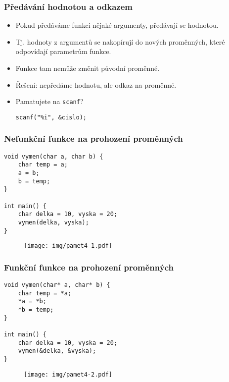 \documentclass{beamer}
\newenvironment{itemizey}%
  {\large \begin{itemize}%
    \setlength{\itemsep}{6pt}%
    \setlength{\parskip}{6pt}}%
  {\end{itemize}}
\begin{document}
\begin{frame}[t,fragile]\frametitle{Předávání hodnotou a odkazem} 
    \begin{itemizey}
        \item Pokud předáváme funkci nějaké argumenty, předávají se hodnotou.
        \item Tj. hodnoty z argumentů se nakopírují do nových proměnných, které odpovídají parametrům funkce.
        \item Funkce tam nemůže změnit původní proměnné. 
        \item Řešení: nepředáme hodnotu, ale odkaz na proměnné. 
        \item Pamatujete na \texttt{scanf}? 
        \begin{verbatim} 
scanf("%i", &cislo);
        \end{verbatim}
    \end{itemizey}
\end{frame}


\begin{frame}[t,fragile]\frametitle{Nefunkční funkce na prohození proměnných} 
    \begin{verbatim} 
void vymen(char a, char b) {
    char temp = a;
    a = b;
    b = temp;
}

int main() {
    char delka = 10, vyska = 20;
    vymen(delka, vyska);
}
    \end{verbatim}

\begin{figure}[htb]
    \centering
    \texttt{[image: img/pamet4-1.pdf]}
\end{figure}
\end{frame}


\begin{frame}[t,fragile]\frametitle{Funkční funkce na prohození proměnných} 
\begin{verbatim} 
void vymen(char* a, char* b) {
    char temp = *a;
    *a = *b;
    *b = temp;
}

int main() {
    char delka = 10, vyska = 20;
    vymen(&delka, &vyska);
}
\end{verbatim}

\begin{figure}[htb]
    \centering
    \texttt{[image: img/pamet4-2.pdf]}
\end{figure}
\end{frame}


\end{document}

